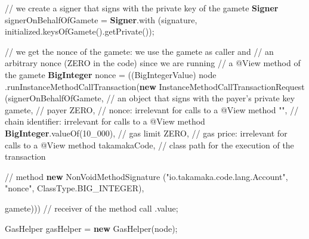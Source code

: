 \documentclass[a4paper,]{book}
\newenvironment{Shaded}{\begin{snugshade}}{\end{snugshade}}
\newcommand{\BuiltInTok}[1]{\textcolor[rgb]{0.39,0.29,0.61}{\textbf{#1}}}
\newcommand{\CommentTok}[1]{\textcolor[rgb]{0.54,0.53,0.53}{#1}}
\newcommand{\DecValTok}[1]{\textcolor[rgb]{0.69,0.50,0.00}{#1}}
\newcommand{\FunctionTok}[1]{\textcolor[rgb]{0.39,0.29,0.61}{#1}}
\newcommand{\KeywordTok}[1]{\textcolor[rgb]{0.12,0.11,0.11}{\textbf{#1}}}
\newcommand{\NormalTok}[1]{\textcolor[rgb]{0.12,0.11,0.11}{#1}}
\newcommand{\StringTok}[1]{\textcolor[rgb]{0.75,0.01,0.01}{#1}}
\renewenvironment{Shaded}{\begin{snugshade}\small}{\end{snugshade}}
\begin{document}
{\begin{Shaded}
\begin{Highlighting}[]
      \CommentTok{// we create a signer that signs with the private key of the gamete}
      \BuiltInTok{Signer}\NormalTok{ signerOnBehalfOfGamete = }\BuiltInTok{Signer}\NormalTok{.}\FunctionTok{with}
\NormalTok{        (signature, initialized.}\FunctionTok{keysOfGamete}\NormalTok{().}\FunctionTok{getPrivate}\NormalTok{());}

      \CommentTok{// we get the nonce of the gamete: we use the gamete as caller and}
      \CommentTok{// an arbitrary nonce (ZERO in the code) since we are running}
      \CommentTok{// a @View method of the gamete}
      \BuiltInTok{BigInteger}\NormalTok{ nonce = ((BigIntegerValue) node}
\NormalTok{        .}\FunctionTok{runInstanceMethodCallTransaction}\NormalTok{(}\KeywordTok{new}\NormalTok{ InstanceMethodCallTransactionRequest}
\NormalTok{          (signerOnBehalfOfGamete, }\CommentTok{// an object that signs with the payer's private key}
\NormalTok{          gamete, }\CommentTok{// payer}
\NormalTok{          ZERO, }\CommentTok{// nonce: irrelevant for calls to a @View method}
          \StringTok{""}\NormalTok{, }\CommentTok{// chain identifier: irrelevant for calls to a @View method}
          \BuiltInTok{BigInteger}\NormalTok{.}\FunctionTok{valueOf}\NormalTok{(}\DecValTok{10_000}\NormalTok{), }\CommentTok{// gas limit}
\NormalTok{          ZERO, }\CommentTok{// gas price: irrelevant for calls to a @View method}
\NormalTok{          takamakaCode, }\CommentTok{// class path for the execution of the transaction}

          \CommentTok{// method}
          \KeywordTok{new}\NormalTok{ NonVoidMethodSignature}
\NormalTok{            (}\StringTok{"io.takamaka.code.lang.Account"}\NormalTok{, }\StringTok{"nonce"}\NormalTok{, ClassType.}\FunctionTok{BIG_INTEGER}\NormalTok{),}

\NormalTok{          gamete))) }\CommentTok{// receiver of the method call}
\NormalTok{        .}\FunctionTok{value}\NormalTok{;}

\NormalTok{      GasHelper gasHelper = }\KeywordTok{new} \FunctionTok{GasHelper}\NormalTok{(node);}


\end{Highlighting}
\end{Shaded}}
\end{document}
